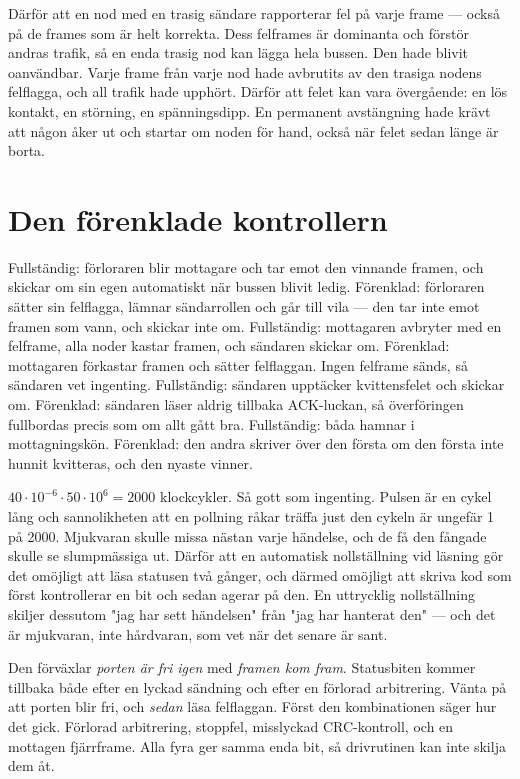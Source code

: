  Därför att en nod med en trasig sändare rapporterar fel på varje frame --- också på de
frames som är helt korrekta. Dess felframes är dominanta och förstör andras trafik, så en enda
trasig nod kan lägga hela bussen.
 Den hade blivit oanvändbar. Varje frame från varje nod hade avbrutits av den trasiga
nodens felflagga, och all trafik hade upphört.
 Därför att felet kan vara övergående: en lös kontakt, en störning, en spänningsdipp. En
permanent avstängning hade krävt att någon åker ut och startar om noden för hand, också när felet
sedan länge är borta.

\section{Den förenklade kontrollern}

 Fullständig: förloraren blir mottagare och tar emot den vinnande framen, och skickar om
sin egen automatiskt när bussen blivit ledig. Förenklad: förloraren sätter sin felflagga, lämnar
sändarrollen och går till vila --- den tar inte emot framen som vann, och skickar inte om.
 Fullständig: mottagaren avbryter med en felframe, alla noder kastar framen, och sändaren
skickar om. Förenklad: mottagaren förkastar framen och sätter felflaggan. Ingen felframe sänds,
så sändaren vet ingenting.
 Fullständig: sändaren upptäcker kvittensfelet och skickar om. Förenklad: sändaren läser
aldrig tillbaka ACK-luckan, så överföringen fullbordas precis som om allt gått bra.
 Fullständig: båda hamnar i mottagningskön. Förenklad: den andra skriver över den första
om den första inte hunnit kvitteras, och den nyaste vinner.

 $40 \cdot 10^{-6} \cdot 50 \cdot 10^{6} = 2000$ klockcykler.
 Så gott som ingenting. Pulsen är en cykel lång och sannolikheten att en pollning råkar
träffa just den cykeln är ungefär 1 på 2000. Mjukvaran skulle missa nästan varje händelse, och de
få den fångade skulle se slumpmässiga ut.
 Därför att en automatisk nollställning vid läsning gör det omöjligt att läsa statusen två
gånger, och därmed omöjligt att skriva kod som först kontrollerar en bit och sedan agerar på den.
En uttrycklig nollställning skiljer dessutom "jag har sett händelsen" från "jag har hanterat
den" --- och det är mjukvaran, inte hårdvaran, som vet när det senare är sant.

 Den förväxlar \emph{porten är fri igen} med \emph{framen kom fram}. Statusbiten kommer
tillbaka både efter en lyckad sändning och efter en förlorad arbitrering.
 Vänta på att porten blir fri, och \emph{sedan} läsa felflaggan. Först den kombinationen
säger hur det gick.
 Förlorad arbitrering, stoppfel, misslyckad CRC-kontroll, och en mottagen fjärrframe. Alla
fyra ger samma enda bit, så drivrutinen kan inte skilja dem åt.


